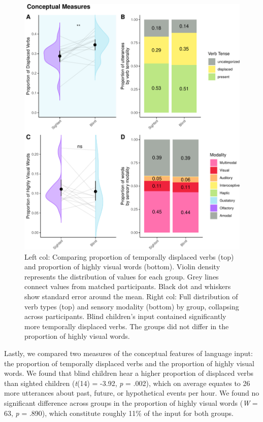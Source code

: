 \documentclass[
  man]{apa6}
\begin{document}
\begin{figure}
\centering
\includegraphics{input_quality_manuscript_files/figure-latex/conceptual-plots-1.pdf}
\caption{\label{fig:conceptual-plots}Left col: Comparing proportion of temporally displaced verbs (top) and proportion of highly visual words (bottom). Violin density represents the distribution of values for each group. Grey lines connect values from matched participants. Black dot and whiskers show standard error around the mean. Right col: Full distribution of verb types (top) and sensory modality (bottom) by group, collapsing across participants. Blind children's input contained significantly more temporally displaced verbs. The groups did not differ in the proportion of highly visual words.}
\end{figure}

Lastly, we compared two measures of the conceptual features of language input: the proportion of temporally displaced verbs and the proportion of highly visual words. We found that blind children hear a higher proportion of displaced verbs than sighted children (\emph{t}(14) = -3.92, \emph{p} = .002), which on average equates to 26 more utterances about past, future, or hypothetical events per hour. We found no significant difference across groups in the proportion of highly visual words (\emph{W} = 63, \emph{p} = .890), which constitute roughly 11\% of the input for both groups.
\end{document}
